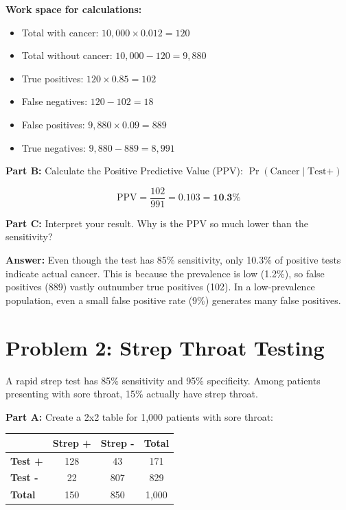 \documentclass[11pt]{article}
\begin{document}
\vspace{12pt}

\textbf{Work space for calculations:}

\begin{itemize}
\item Total with cancer: $10,000 \times 0.012 = 120$
\item Total without cancer: $10,000 - 120 = 9,880$
\item True positives: $120 \times 0.85 = 102$
\item False negatives: $120 - 102 = 18$
\item False positives: $9,880 \times 0.09 = 889$
\item True negatives: $9,880 - 889 = 8,991$
\end{itemize}

\vspace{12pt}

\textbf{Part B:} Calculate the Positive Predictive Value (PPV): $\Pr(\text{Cancer} \mid \text{Test+})$

$$\text{PPV} = \frac{102}{991} = 0.103 = \textbf{10.3\%}$$

\vspace{6pt}

\textbf{Part C:} Interpret your result. Why is the PPV so much lower than the sensitivity?

\textbf{Answer:} Even though the test has 85\% sensitivity, only 10.3\% of positive tests indicate actual cancer. This is because the prevalence is low (1.2\%), so false positives (889) vastly outnumber true positives (102). In a low-prevalence population, even a small false positive rate (9\%) generates many false positives.

\newpage

\section{Problem 2: Strep Throat Testing}

A rapid strep test has 85\% sensitivity and 95\% specificity. Among patients presenting with sore throat, 15\% actually have strep throat.

\vspace{12pt}

\textbf{Part A:} Create a 2x2 table for 1,000 patients with sore throat:

\vspace{12pt}

\begin{center}
\begin{tabular}{|l|c|c|c|}
\hline
& \textbf{Strep +} & \textbf{Strep -} & \textbf{Total} \\
\hline
\textbf{Test +} & 128 & 43 & 171 \\[2ex]
\hline
\textbf{Test -} & 22 & 807 & 829 \\[2ex]
\hline
\textbf{Total} & 150 & 850 & 1,000 \\[2ex]
\hline
\end{tabular}
\end{center}
\end{document}
